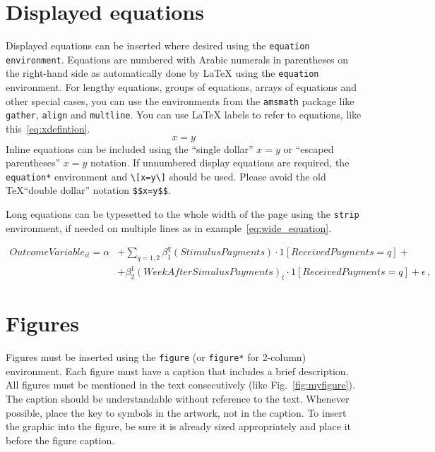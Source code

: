 \documentclass[english]{jasb}
\begin{document}
\section{Displayed equations}
Displayed equations can be inserted where desired using the \texttt{equation environment}. Equations are numbered with Arabic numerals in parentheses on the right-hand side as automatically done by LaTeX using the \texttt{equation} environment. For lengthy equations, groups of equations, arrays of equations and other special cases, you can use the environments from the \texttt{amsmath} package like \texttt{gather}, \texttt{align} and \texttt{multline}. You can use \LaTeX{} labels to refer to equations, like this~\eqref{eq:xdefintion}.
\begin{equation}
    x=y
    \label{eq:xdefintion}
\end{equation}
Inline equations can be included using the ``single dollar'' $x=y$ or ``escaped parentheses'' \(x=y\) notation. If unnumbered display equations are required, the \texttt{equation*} environment and \texttt{\textbackslash[x=y\textbackslash]} should be used. Please avoid the old \TeX ``double dollar'' notation \texttt{\$\$x=y\$\$}.

Long equations can be typesetted to the whole width of the page using the 
\texttt{strip} environment, if needed on multiple lines as 
in example~\eqref{eq:wide_equation}.
 \begin{strip}
   \begin{equation}
   \begin{split}
      OutcomeVariable_{it} = \alpha &+ \sum_{q = 1,2} \beta_1^q (StimulusPayments) \cdot 1 \left[ReceivedPayments=q\right] + \\
      &+ \beta_2^1(WeekAfterSimulusPayments)_t \cdot 1 \left[ReceivedPayments=q\right] + \epsilon\,,
       \label{eq:wide_equation}
   \end{split}
   \end{equation}
   \end{strip}

\section{Figures}
Figures must be inserted using the \texttt{figure} (or \texttt{figure*} for 2-column) environment. Each figure must have a caption that includes a brief description. All figures must be mentioned in the text consecutively (like Fig.~\ref{fig:myfigure}). The caption should be understandable without reference to the text. Whenever possible, place the key to symbols in the artwork, not in the caption. To insert the graphic into the figure, be sure it is already sized appropriately and place it before the figure caption.
\end{document}
